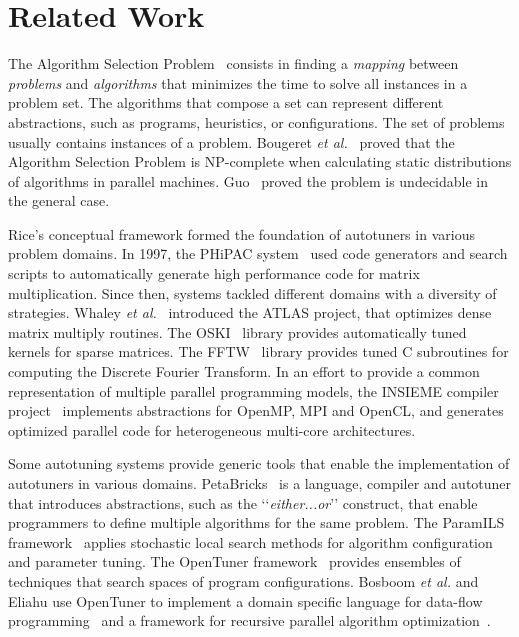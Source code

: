 \section{Related Work} \label{sec:related}

The Algorithm Selection Problem~\cite{rice1976algorithm} consists in finding a
\emph{mapping} between \emph{problems} and \emph{algorithms} that minimizes the
time to solve all instances in a problem set. The algorithms that compose a set
can represent different abstractions, such as programs, heuristics, or
configurations. The set of problems usually contains instances of a problem.
Bougeret \emph{et al.}~\cite{bougeret2009combining} proved that the Algorithm
Selection Problem is NP-complete when calculating static distributions of
algorithms in parallel machines.  Guo~\cite{guo2003algorithm} proved the
problem is undecidable in the general case.

Rice's conceptual framework formed the foundation of autotuners in various
problem domains.  In 1997, the PHiPAC system~\cite{bilmes1997phipac} used code
generators and search scripts to automatically generate high performance code
for matrix multiplication. Since then, systems tackled different domains with a
diversity of strategies. Whaley \emph{et al.}~\cite{whaley1998atlas} introduced
the ATLAS project, that optimizes dense matrix multiply routines. The
OSKI~\cite{vuduc2005oski} library provides automatically tuned kernels for
sparse matrices. The FFTW~\cite{frigo1998fftw} library provides tuned C
subroutines for computing the Discrete Fourier Transform.  In an effort to
provide a common representation of multiple parallel programming models, the
INSIEME compiler project~\cite{jordan2012multi} implements abstractions for
OpenMP, MPI and OpenCL, and generates optimized parallel code for heterogeneous
multi-core architectures.

Some autotuning systems provide generic tools that enable the implementation of
autotuners in various domains. PetaBricks~\cite{ansel2009petabricks} is a
language, compiler and autotuner that introduces abstractions, such as the
\lq\lq{}\emph{either...or}\rq\rq{} construct, that enable programmers to define
multiple algorithms for the same problem.  The ParamILS
framework~\cite{hutter2009paramils} applies stochastic local search methods
for algorithm configuration and parameter tuning.  The OpenTuner
framework~\cite{ansel2014opentuner} provides ensembles of techniques that
search spaces of program configurations. Bosboom \emph{et al.} and Eliahu use
OpenTuner to implement a domain specific language for data-flow
programming~\cite{bosboom2014streamjit} and a framework for recursive parallel
algorithm optimization~\cite{eliahu2015frpa}.
